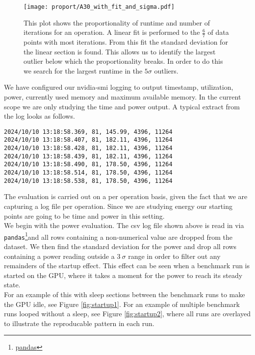 \documentclass[conference]{IEEEtran}
\begin{document}
\begin{figure}
    \centering
    \texttt{[image: proport/A30\_with\_fit\_and\_sigma.pdf]}
    \caption{This plot shows the proportionality of runtime and number of iterations for an operation. A linear fit is performed to the $\frac{6}{7}$ of data points with most iterations. From this fit the standard deviation for the linear section is found. This allows us to identify the largest outlier below which the proportionality breaks. In order to do this we search for the largest runtime in the $5\sigma$ outliers.}
    \label{fig:proport}
\end{figure}

We have configured our nvidia-smi logging to output timestamp, utilization, power, currently used memory and maximum available memory. In the current scope we are only studying the time and power output. A typical extract from the log looks as follows.


\begin{footnotesize} %
\begin{verbatim}
2024/10/10 13:18:58.369, 81, 145.99, 4396, 11264
2024/10/10 13:18:58.407, 81, 182.11, 4396, 11264
2024/10/10 13:18:58.428, 81, 182.11, 4396, 11264
2024/10/10 13:18:58.439, 81, 182.11, 4396, 11264
2024/10/10 13:18:58.490, 81, 178.50, 4396, 11264
2024/10/10 13:18:58.514, 81, 178.50, 4396, 11264
2024/10/10 13:18:58.538, 81, 178.50, 4396, 11264
\end{verbatim}
\end{footnotesize}

The evaluation is carried out on a per operation basis, given the fact that we are capturing a log file per operation. Since we are studying energy our starting points are going to be time and power in this setting. \\ 
We begin with the power evaluation. The csv log file shown above is read in via \texttt{pandas}\footnote{\href{https://pandas.pydata.org/}{pandas}}and all rows containing a non-numerical value are dropped from the dataset. We then find the standard deviation for the power and drop all rows containing a power reading outside a $3 \: \sigma $ range in order to filter out any remainders of the startup effect. This effect can be seen when a benchmark run is started on the GPU, where it takes a moment for the power to reach its steady state. \\
For an example of this with sleep sections between the benchmark runs to make the GPU idle, see Figure \ref{fig:startup1}. For an example of multiple benchmark runs looped without a sleep, see Figure \ref{fig:startup2}, where all runs are overlayed to illustrate the reproducable pattern in each run.
\end{document}
